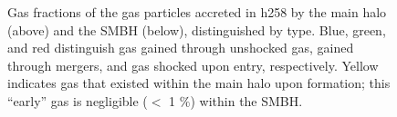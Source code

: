 \documentclass[manuscript]{aastex}
\begin{document}
\begin{figure}
\centerline{}
\centerline{}
\caption[]{Gas fractions of the gas particles accreted in h258 by the main halo (above) and the SMBH (below), distinguished by type. Blue, green, and red distinguish gas gained through unshocked gas, gained through mergers, and gas shocked upon entry, respectively. Yellow indicates gas that existed within the main halo upon formation; this ``early'' gas is negligible ($<$ 1 $\%$) within the SMBH.}
\label{h258piefrac} 
\end{figure}
\end{document}
